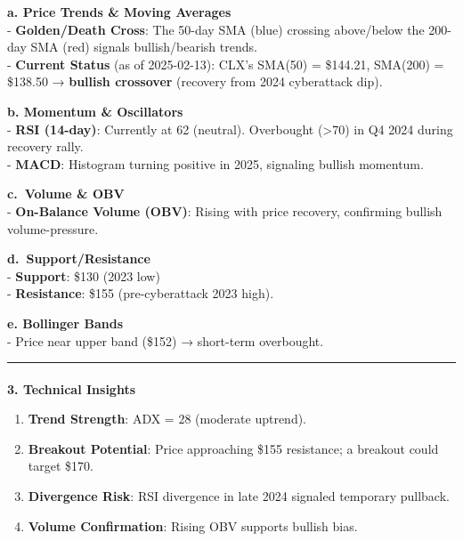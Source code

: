 \documentclass[
  letterpaper,
  DIV=11,
  numbers=noendperiod]{scrartcl}
\makeatletter
\let\oldparagraph\paragraph
\renewcommand{\paragraph}{
    \@ifstar
      \xxxParagraphStar
      \xxxParagraphNoStar
  }
\newcommand{\xxxParagraphStar}[1]{\oldparagraph*{#1}\mbox{}}
\newcommand{\xxxParagraphNoStar}[1]{\oldparagraph{#1}\mbox{}}
\providecommand{\tightlist}{%
  \setlength{\itemsep}{0pt}\setlength{\parskip}{0pt}}\usepackage{longtable,booktabs,array}
\makeatother
\begin{document}
\textbf{a. Price Trends \& Moving Averages}\\
- \textbf{Golden/Death Cross}: The 50-day SMA (blue) crossing
above/below the 200-day SMA (red) signals bullish/bearish trends.\\
- \textbf{Current Status} (as of 2025-02-13): CLX's SMA(50) = \$144.21,
SMA(200) = \$138.50 → \textbf{bullish crossover} (recovery from 2024
cyberattack dip).

\textbf{b. Momentum \& Oscillators}\\
- \textbf{RSI (14-day)}: Currently at 62 (neutral). Overbought
(\textgreater70) in Q4 2024 during recovery rally.\\
- \textbf{MACD}: Histogram turning positive in 2025, signaling bullish
momentum.

\textbf{c.~Volume \& OBV}\\
- \textbf{On-Balance Volume (OBV)}: Rising with price recovery,
confirming bullish volume-pressure.

\textbf{d.~Support/Resistance}\\
- \textbf{Support}: \$130 (2023 low)\\
- \textbf{Resistance}: \$155 (pre-cyberattack 2023 high).

\textbf{e. Bollinger Bands}\\
- Price near upper band (\$152) → short-term overbought.

\begin{center}\rule{0.5\linewidth}{0.5pt}\end{center}

\paragraph{\texorpdfstring{\textbf{3. Technical
Insights}}{3. Technical Insights}}\label{technical-insights}

\begin{enumerate}
\def\labelenumi{\arabic{enumi}.}
\tightlist
\item
  \textbf{Trend Strength}: ADX = 28 (moderate uptrend).\\
\item
  \textbf{Breakout Potential}: Price approaching \$155 resistance; a
  breakout could target \$170.\\
\item
  \textbf{Divergence Risk}: RSI divergence in late 2024 signaled
  temporary pullback.\\
\item
  \textbf{Volume Confirmation}: Rising OBV supports bullish bias.
\end{enumerate}
\end{document}
